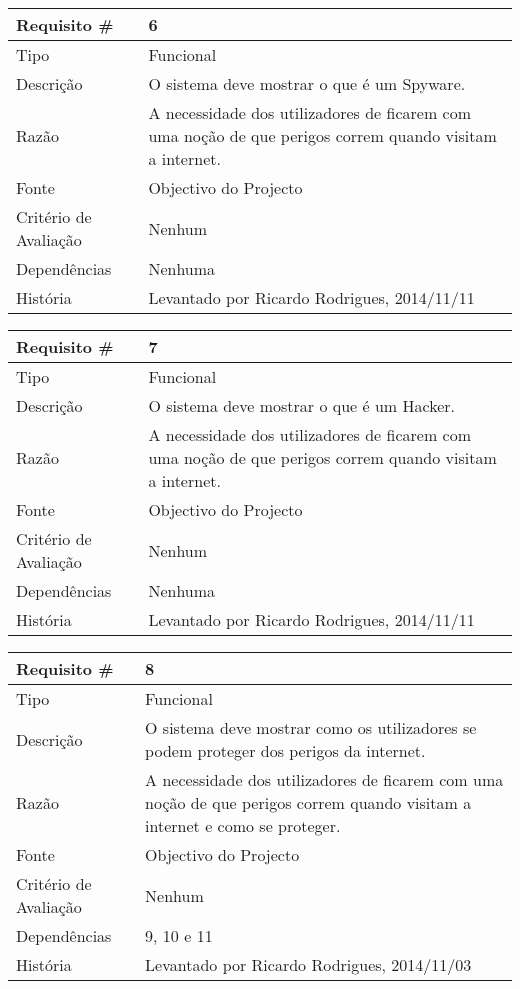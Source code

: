 \begin{tabular} {|l|p{8cm}|} 
\hline
Requisito \# & 6 \\
\hline
Tipo & Funcional \\
\hline
Descrição & O sistema deve mostrar o que é um Spyware. \\
\hline
Razão & A necessidade dos utilizadores de ficarem com uma noção de que perigos correm quando visitam a internet. \\
\hline
Fonte & Objectivo do Projecto \\
\hline
Critério de Avaliação & Nenhum\\
\hline
Dependências & Nenhuma \\
\hline
História & Levantado por Ricardo Rodrigues, 2014/11/11 \\
\hline
\end{tabular}

\begin{tabular} {|l|p{8cm}|} 
\hline
Requisito \# & 7 \\
\hline
Tipo & Funcional \\
\hline
Descrição & O sistema deve mostrar o que é um Hacker. \\
\hline
Razão & A necessidade dos utilizadores de ficarem com uma noção de que perigos correm quando visitam a internet. \\
\hline
Fonte & Objectivo do Projecto \\
\hline
Critério de Avaliação & Nenhum\\
\hline
Dependências & Nenhuma \\
\hline
História & Levantado por Ricardo Rodrigues, 2014/11/11 \\
\hline
\end{tabular}

\begin{tabular} {|l|p{8cm}|} 
\hline
Requisito \# & 8 \\
\hline
Tipo & Funcional \\
\hline
Descrição & O sistema deve mostrar como os utilizadores se podem proteger dos perigos da internet. \\
\hline
Razão & A necessidade dos utilizadores de ficarem com uma noção de que perigos correm quando visitam a internet e como se proteger. \\
\hline
Fonte & Objectivo do Projecto \\
\hline
Critério de Avaliação & Nenhum\\
\hline
Dependências & 9, 10 e 11 \\
\hline
História & Levantado por Ricardo Rodrigues, 2014/11/03 \\
\hline
\end{tabular}

